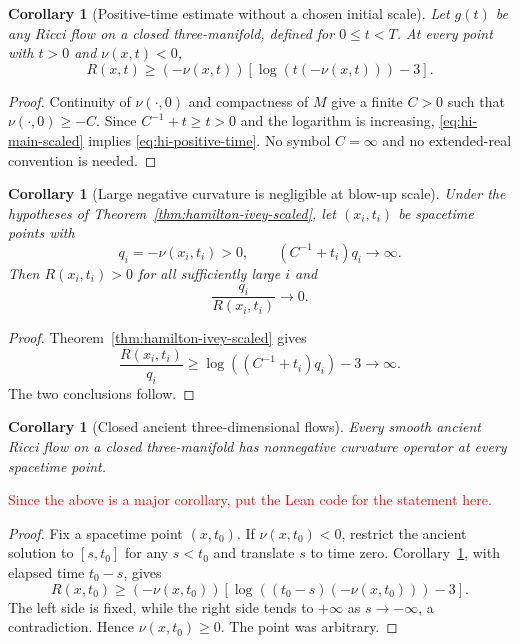 \documentclass[10pt]{coll-l}
\newtheorem{corollary}[theorem]{Corollary}
\theoremstyle{definition}
\theoremstyle{remark}
\numberwithin{section}{chapter}
\numberwithin{equation}{chapter}
\begin{document}
\begin{corollary}[Positive-time estimate without a chosen initial scale]
\label{cor:hi-positive-time}
Let $g(t)$ be any Ricci flow on a closed three-manifold, defined for
$0\leq t<T$.  At every point with $t>0$ and $\nu(x,t)<0$,
\begin{equation}
        R(x,t)\geq
        (-\nu(x,t))
        \left[\log\!\left(t(-\nu(x,t))\right)-3\right].    \label{eq:hi-positive-time}
\end{equation}
\end{corollary}

\begin{proof}
Continuity of $\nu(\cdot,0)$ and compactness of $M$ give a finite $C>0$
such that $\nu(\cdot,0)\geq-C$.  Since $C^{-1}+t\geq t>0$ and the logarithm
is increasing, \eqref{eq:hi-main-scaled} implies
\eqref{eq:hi-positive-time}.  No symbol $C=\infty$ and no extended-real
convention is needed.
\end{proof}

\begin{corollary}[Large negative curvature is negligible at blow-up scale]
\label{cor:hi-negative-negligible}
Under the hypotheses of Theorem~\ref{thm:hamilton-ivey-scaled}, let
$(x_i,t_i)$ be spacetime points with
\[
 q_i=-\nu(x_i,t_i)>0,
 \qquad
 (C^{-1}+t_i)q_i\longrightarrow\infty.
\]
Then $R(x_i,t_i)>0$ for all sufficiently large $i$ and
\begin{equation}
             \frac{q_i}{R(x_i,t_i)}\longrightarrow0.      \label{eq:hi-negative-ratio}
\end{equation}
\end{corollary}

\begin{proof}
Theorem~\ref{thm:hamilton-ivey-scaled} gives
\[
 \frac{R(x_i,t_i)}{q_i}
   \geq\log\!\left((C^{-1}+t_i)q_i\right)-3
   \longrightarrow\infty.
\]
The two conclusions follow.
\end{proof}

\begin{corollary}[Closed ancient three-dimensional flows]
\label{cor:hi-ancient-nonnegative}
Every smooth ancient Ricci flow on a closed three-manifold has nonnegative
curvature operator at every spacetime point.
\end{corollary}

\textcolor{red}{Since the above is a major corollary, put the Lean code for the statement here.}

\begin{proof}
Fix a spacetime point $(x,t_0)$.  If $\nu(x,t_0)<0$, restrict the ancient
solution to $[s,t_0]$ for any $s<t_0$ and translate $s$ to time zero.
Corollary~\ref{cor:hi-positive-time}, with elapsed time $t_0-s$, gives
\[
 R(x,t_0)\geq(-\nu(x,t_0))
 \left[
   \log\!\left((t_0-s)(-\nu(x,t_0))\right)-3
 \right].
\]
The left side is fixed, while the right side tends to $+\infty$ as
$s\to-\infty$, a contradiction.  Hence $\nu(x,t_0)\geq0$.  The point was
arbitrary.
\end{proof}
\end{document}
